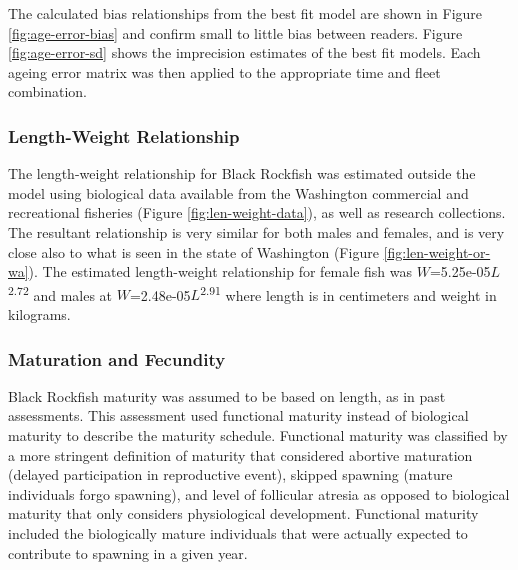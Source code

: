 \documentclass[11pt,
  english,
  letterpaper,
]{article}
\begin{document}
The calculated bias relationships from the best fit model are shown in Figure \ref{fig:age-error-bias} and confirm small to little bias between readers. Figure \ref{fig:age-error-sd} shows the imprecision estimates of the best fit models. Each ageing error matrix was then applied to the appropriate time and fleet combination.

\hypertarget{length-weight-relationship}{%
\subsubsection{Length-Weight Relationship}\label{length-weight-relationship}}

The length-weight relationship for Black Rockfish was estimated outside the model using biological data available from the Washington commercial and recreational fisheries (Figure \ref{fig:len-weight-data}), as well as research collections. The resultant relationship is very similar for both males and females, and is very close also to what is seen in the state of Washington (Figure \ref{fig:len-weight-or-wa}). The estimated length-weight relationship for female fish was \(W\)=5.25e-05\(L\)\textsuperscript{2.72} and males at \(W\)=2.48e-05\(L\)\textsuperscript{2.91} where length is in centimeters and weight in kilograms.

\hypertarget{maturation-and-fecundity}{%
\subsubsection{Maturation and Fecundity}\label{maturation-and-fecundity}}

Black Rockfish maturity was assumed to be based on length, as in past assessments. This assessment used functional maturity instead of biological maturity to describe the maturity schedule. Functional maturity was classified by a more stringent definition of maturity that considered abortive maturation (delayed participation in reproductive event), skipped spawning (mature individuals forgo spawning), and level of follicular atresia as opposed to biological maturity that only considers physiological development. Functional maturity included the biologically mature individuals that were actually expected to contribute to spawning in a given year.
\end{document}

